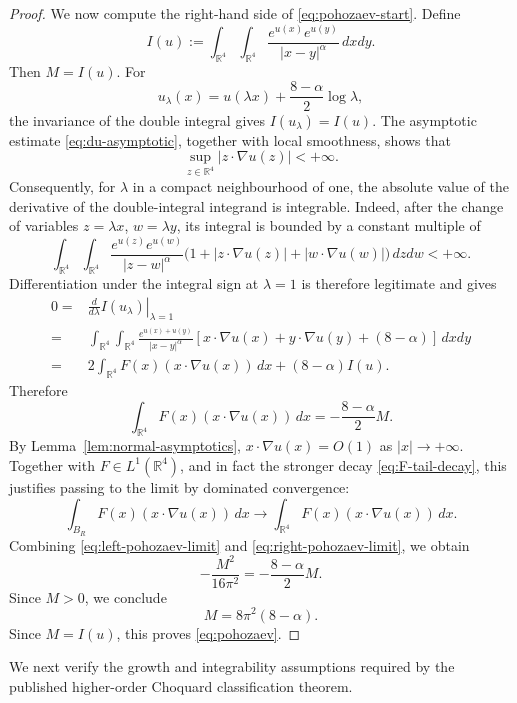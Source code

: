 \documentclass[11pt]{article}
\numberwithin{equation}{section}
\begin{document}
\begin{proof}
We now compute the right-hand side of \eqref{eq:pohozaev-start}. Define
\[
I(u):=
\int_{\mathbb R^{4}}\int_{\mathbb R^{4}}
\frac{e^{u(x)}e^{u(y)}}{|x-y|^{\alpha}}\,dxdy.
\]
Then \(M=I(u)\). For
\[
u_{\lambda}(x)=u(\lambda x)+\frac{8-\alpha}{2}\log\lambda,
\]
the invariance of the double integral gives \(I(u_{\lambda})=I(u)\). The
asymptotic estimate \eqref{eq:du-asymptotic}, together with local smoothness,
shows that
\[
\sup_{z\in\mathbb R^{4}}|z\cdot\nabla u(z)|<+\infty.
\]
Consequently, for \(\lambda\) in a compact neighbourhood of one, the absolute
value of the derivative of the double-integral integrand is integrable. Indeed,
after the change of variables \(z=\lambda x\), \(w=\lambda y\), its integral is
bounded by a constant multiple of
\[
\int_{\mathbb R^{4}}\int_{\mathbb R^{4}}
\frac{e^{u(z)}e^{u(w)}}{|z-w|^{\alpha}}
\bigl(1+|z\cdot\nabla u(z)|+|w\cdot\nabla u(w)|\bigr)\,dzdw<+\infty.
\]
Differentiation under the integral sign at \(\lambda=1\) is therefore
legitimate and gives
\[
\begin{aligned}
0
={}&\left.\frac{d}{d\lambda}I(u_{\lambda})\right|_{\lambda=1}\\
={}&
\int_{\mathbb R^{4}}\int_{\mathbb R^{4}}
\frac{e^{u(x)+u(y)}}{|x-y|^{\alpha}}
\left[x\cdot\nabla u(x)+y\cdot\nabla u(y)+(8-\alpha)\right]\,dxdy\\
={}&
2\int_{\mathbb R^{4}}F(x)(x\cdot\nabla u(x))\,dx
+(8-\alpha)I(u).
\end{aligned}
\]
Therefore
\begin{equation}\label{eq:right-pohozaev-limit}
\int_{\mathbb R^{4}}F(x)(x\cdot\nabla u(x))\,dx
=
-\frac{8-\alpha}{2}M.
\end{equation}
By Lemma~\ref{lem:normal-asymptotics}, \(x\cdot\nabla u(x)=O(1)\) as \(|x|\to+\infty\). Together with \(F\in L^{1}(\mathbb R^{4})\), and in fact the stronger decay \eqref{eq:F-tail-decay}, this justifies passing to the limit by dominated convergence:
\[
\int_{B_{R}}F(x)(x\cdot\nabla u(x))\,dx
\to
\int_{\mathbb R^{4}}F(x)(x\cdot\nabla u(x))\,dx.
\]
Combining \eqref{eq:left-pohozaev-limit} and \eqref{eq:right-pohozaev-limit}, we obtain
\[
-\frac{M^{2}}{16\pi^{2}}
=
-\frac{8-\alpha}{2}M.
\]
Since \(M>0\), we conclude
\[
M=8\pi^{2}(8-\alpha).
\]
Since \(M=I(u)\), this proves \eqref{eq:pohozaev}.
\end{proof}

We next verify the growth and integrability assumptions required by the published higher-order Choquard classification theorem.
\end{document}
